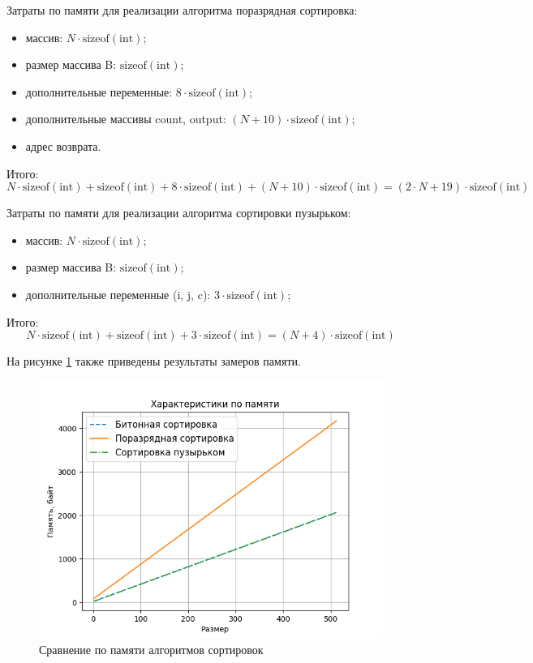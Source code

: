 Затраты по памяти для реализации алгоритма поразрядная сортировка:
\begin{itemize}
	\item массив: $N \cdot \text{sizeof}(\text{int})$;
	\item размер массива B: $\text{sizeof}(\text{int})$;
	\item дополнительные переменные: $8\cdot \text{sizeof}(\text{int})$;
	\item дополнительные массивы count, output: $(N + 10) \cdot\text{sizeof}(\text{int})$;
	\item адрес возврата.
\end{itemize}

Итого:
\begin{equation}
	\label{eq:wino_alg}
	N \cdot \text{sizeof}(\text{int}) + \text{sizeof}(\text{int}) + 8\cdot \text{sizeof}(\text{int}) + (N + 10) \cdot\text{sizeof}(\text{int}) = (2 \cdot N + 19) \cdot \text{sizeof}(\text{int}) 
\end{equation}

Затраты по памяти для реализации алгоритма сортировки пузырьком:
\begin{itemize}
	\item массив: $N \cdot \text{sizeof}(\text{int})$;
	\item размер массива B: $\text{sizeof}(\text{int})$;
	\item дополнительные переменные (i, j, c): $3\cdot \text{sizeof}(\text{int})$;
\end{itemize}

Итого:
\begin{equation}
	\label{eq:optimized_alg}
		N \cdot \text{sizeof}(\text{int}) + \text{sizeof}(\text{int}) + 3\cdot \text{sizeof}(\text{int}) = (N + 4) \cdot \text{sizeof}(\text{int}) 
\end{equation}

На рисунке \ref{img:mem} также приведены результаты замеров памяти. 

\begin{figure}[h]
	\begin{center}
		\includegraphics[scale=0.7]{img/mem.png}
	\end{center}
	\captionsetup{justification=centering}
	\caption{Сравнение по памяти алгоритмов сортировок}
	\label{img:mem}
\end{figure}
